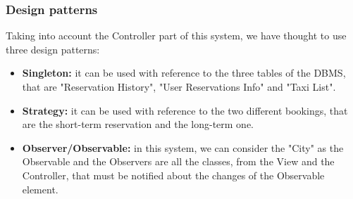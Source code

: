 	\subsubsection{Design patterns}
	Taking into account the Controller part of this system, we have thought to use three design patterns:
		\begin{itemize}
			\item \textbf{Singleton:} it can be used with reference to the three tables of the DBMS, that are "Reservation History", "User Reservations Info" and "Taxi List".
			\item \textbf{Strategy:} it can be used with reference to the two different bookings, that are the short-term reservation and the long-term one.
			\item \textbf{Observer/Observable:} in this system, we can consider the "City" as the Observable and the Observers are all the classes, from the View and the Controller, that must be notified about the changes of the Observable element.
		\end{itemize}
		
		
		
		
		
		
		
		
		
		
		
		
		
		
		
		
		
		
		
		
		
		
		
		
		
		
		
	
	
	
	
	
	